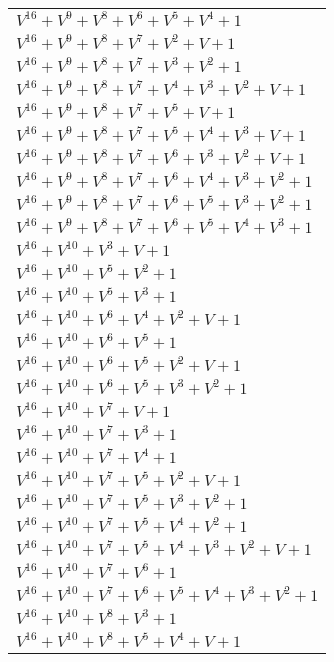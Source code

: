 \documentclass[12pt]{article}
\begin{document}
\begin{adjustwidth}{-4cm}{}
\begin{center}
\begin{longtable}{|l|}
$V^{16}  +V^{9}  +V^{8}  +V^{6}  +V^{5}  +V^{4}  + 1$ \\
$V^{16}  +V^{9}  +V^{8}  +V^{7}  +V^{2}  + V + 1$ \\
$V^{16}  +V^{9}  +V^{8}  +V^{7}  +V^{3}  +V^{2}  + 1$ \\
$V^{16}  +V^{9}  +V^{8}  +V^{7}  +V^{4}  +V^{3}  +V^{2}  + V + 1$ \\
$V^{16}  +V^{9}  +V^{8}  +V^{7}  +V^{5}  + V + 1$ \\
$V^{16}  +V^{9}  +V^{8}  +V^{7}  +V^{5}  +V^{4}  +V^{3}  + V + 1$ \\
$V^{16}  +V^{9}  +V^{8}  +V^{7}  +V^{6}  +V^{3}  +V^{2}  + V + 1$ \\
$V^{16}  +V^{9}  +V^{8}  +V^{7}  +V^{6}  +V^{4}  +V^{3}  +V^{2}  + 1$ \\
$V^{16}  +V^{9}  +V^{8}  +V^{7}  +V^{6}  +V^{5}  +V^{3}  +V^{2}  + 1$ \\
$V^{16}  +V^{9}  +V^{8}  +V^{7}  +V^{6}  +V^{5}  +V^{4}  +V^{3}  + 1$ \\
$V^{16}  +V^{10}  +V^{3}  + V + 1$ \\
$V^{16}  +V^{10}  +V^{5}  +V^{2}  + 1$ \\
$V^{16}  +V^{10}  +V^{5}  +V^{3}  + 1$ \\
$V^{16}  +V^{10}  +V^{6}  +V^{4}  +V^{2}  + V + 1$ \\
$V^{16}  +V^{10}  +V^{6}  +V^{5}  + 1$ \\
$V^{16}  +V^{10}  +V^{6}  +V^{5}  +V^{2}  + V + 1$ \\
$V^{16}  +V^{10}  +V^{6}  +V^{5}  +V^{3}  +V^{2}  + 1$ \\
$V^{16}  +V^{10}  +V^{7}  + V + 1$ \\
$V^{16}  +V^{10}  +V^{7}  +V^{3}  + 1$ \\
$V^{16}  +V^{10}  +V^{7}  +V^{4}  + 1$ \\
$V^{16}  +V^{10}  +V^{7}  +V^{5}  +V^{2}  + V + 1$ \\
$V^{16}  +V^{10}  +V^{7}  +V^{5}  +V^{3}  +V^{2}  + 1$ \\
$V^{16}  +V^{10}  +V^{7}  +V^{5}  +V^{4}  +V^{2}  + 1$ \\
$V^{16}  +V^{10}  +V^{7}  +V^{5}  +V^{4}  +V^{3}  +V^{2}  + V + 1$ \\
$V^{16}  +V^{10}  +V^{7}  +V^{6}  + 1$ \\
$V^{16}  +V^{10}  +V^{7}  +V^{6}  +V^{5}  +V^{4}  +V^{3}  +V^{2}  + 1$ \\
$V^{16}  +V^{10}  +V^{8}  +V^{3}  + 1$ \\
$V^{16}  +V^{10}  +V^{8}  +V^{5}  +V^{4}  + V + 1$ \\

\end{longtable}
\end{center}
\end{adjustwidth}
\end{document}

